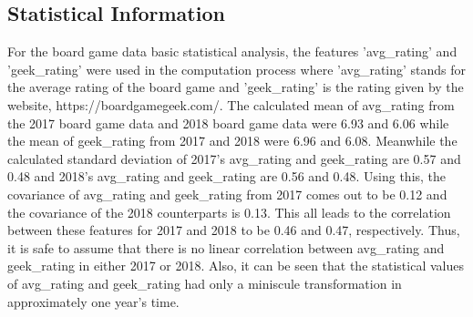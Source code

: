 \documentclass[a4paper,12pt]{IEEEtran}
\begin{document}
\subsection{Statistical Information}
\label{sec5}
For the board game data basic statistical analysis, the features 'avg\_rating' and 'geek\_rating' were used in the computation process where 'avg\_rating' stands for the average rating of the board game and 'geek\_rating' is the rating given by the website, https://boardgamegeek.com/. The calculated mean of avg\_rating from the 2017 board game data and 2018 board game data were 6.93 and 6.06 while the mean of geek\_rating from 2017 and 2018 were 6.96 and 6.08. Meanwhile the calculated standard deviation of 2017's avg\_rating and geek\_rating are 0.57 and 0.48 and 2018's avg\_rating and geek\_rating are 0.56 and 0.48. Using this, the covariance of avg\_rating and geek\_rating from 2017 comes out to be 0.12 and the covariance of the 2018 counterparts is 0.13. This all leads to the correlation between these features for 2017 and 2018 to be 0.46 and 0.47, respectively. Thus, it is safe to assume that there is no linear correlation between avg\_rating and geek\_rating in either 2017 or 2018. Also, it can be seen that the statistical values of avg\_rating and geek\_rating had only a miniscule transformation in approximately one year's time.
\end{document}
